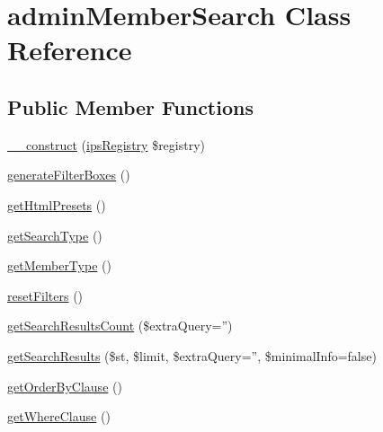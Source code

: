 \hypertarget{classadmin_member_search}{\section{admin\-Member\-Search Class Reference}
\label{classadmin_member_search}
}
\subsection*{Public Member Functions}
\begin{DoxyCompactItemize}
\item 
\hyperlink{classadmin_member_search_a178c3a93e57e75dd87a5d39112af0b07}{\-\_\-\-\_\-construct} (\hyperlink{classips_registry}{ips\-Registry} \$registry)
\item 
\hyperlink{classadmin_member_search_a7da1423d8d3cffdd4e3c047c17375b4d}{generate\-Filter\-Boxes} ()
\item 
\hyperlink{classadmin_member_search_a0894d348201fdb84f2b00a969b5d70ea}{get\-Html\-Presets} ()
\item 
\hyperlink{classadmin_member_search_a03b948ca50283174697e13baf66c6378}{get\-Search\-Type} ()
\item 
\hyperlink{classadmin_member_search_a497ea00514b41bc3171ba5c9e734e997}{get\-Member\-Type} ()
\item 
\hyperlink{classadmin_member_search_ad2e681e2937233af88e972a42f68a231}{reset\-Filters} ()
\item 
\hyperlink{classadmin_member_search_a32fb5143336ee07752efc7fa86810186}{get\-Search\-Results\-Count} (\$extra\-Query='')
\item 
\hyperlink{classadmin_member_search_ab2cf5af5c4784d44ab1489ce48be280a}{get\-Search\-Results} (\$st, \$limit, \$extra\-Query='', \$minimal\-Info=false)
\item 
\hyperlink{classadmin_member_search_afcfc6ffdc8d1a7152d8fdc49f5e1b53a}{get\-Order\-By\-Clause} ()
\item 
\hyperlink{classadmin_member_search_a7975d237e1dbc564ea9865f6f04e6eb8}{get\-Where\-Clause} ()
\end{DoxyCompactItemize}
